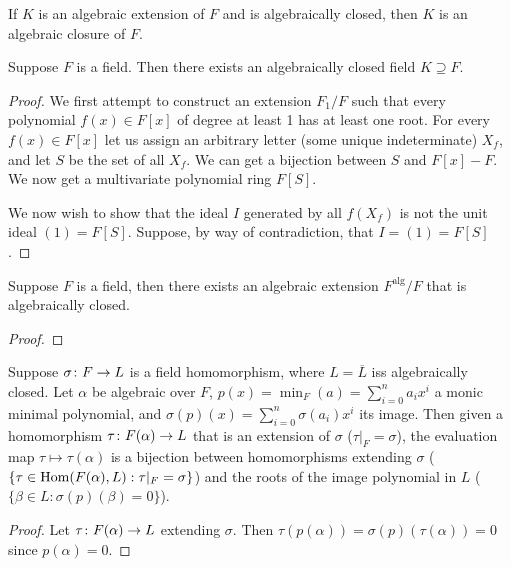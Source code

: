 \begin{definition}
    If \(K\) is an algebraic extension of \(F\) and is algebraically closed,
    then \(K\) is an algebraic closure of \(F\).
\end{definition}
\begin{theorem}
    Suppose \(F\) is a field.
    Then there exists an algebraically closed field \(K \supseteq F\).
\end{theorem}
\begin{proof}
    We first attempt to construct an extension \(F_1/F\)
    such that every polynomial \(f(x) \in F[x]\) of degree at least 1
    has at least one root.
    For every \(f(x) \in F[x]\) let us assign an arbitrary letter
    (some unique indeterminate) \(X_f\),
    and let \(S\) be the set of all \(X_f\).
    We can get a bijection between \(S\) and \(F[x] - F\).
    We now get a multivariate polynomial ring \(F[S]\).

    We now wish to show that the ideal \(I\) generated by all \(f(X_f)\)
    is not the unit ideal \((1) = F[S]\).
    Suppose, by way of contradiction, that \(I = (1) = F[S]\).
\end{proof}
\begin{corollary}
    Suppose \(F\) is a field,
    then there exists an algebraic extension \(F^\text{alg}/F\)
    that is algebraically closed.
\end{corollary}
\begin{proof}
\end{proof}

\begin{proposition}
    Suppose \(\sigma\colon F\to L\) is a field homomorphism,
    where \(L = \overline{L}\) iss algebraically closed.
    Let \(\alpha\) be algebraic over \(F\),
    \(p(x) = \min_F(a) = \sum_{i=0}^n a_i x^i\) a monic minimal polynomial,
    and \(\sigma(p)(x) = \sum_{i=0}^n \sigma(a_i)x^i\) its image.
    Then given a homomorphism \(\tau\colon F(\alpha)\to L\)
    that is an extension of \(\sigma\) (\(\tau\vert_F = \sigma\)),
    the evaluation map \(\tau \mapsto \tau(\alpha)\)
    is a bijection between homomorphisms extending \(\sigma\)
    (\(\{\tau\in\operatorname{Hom}(F(\alpha),L): \tau\vert_F = \sigma\}\))
    and the roots of the image polynomial in \(L\)
    (\(\{\beta \in L : \sigma(p)(\beta) = 0\}\)).
\end{proposition}
\begin{proof}
    Let \(\tau\colon F(\alpha)\to L\) extending \(\sigma\).
    Then \(\tau(p(\alpha)) = \sigma(p)(\tau(\alpha)) = 0\)
    since \(p(\alpha) = 0\).
\end{proof}

